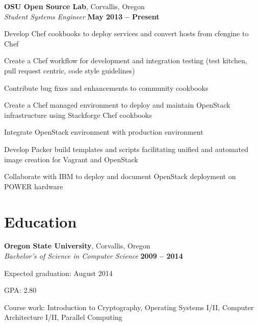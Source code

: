 \documentclass[margin,line]{resume}
\begin{document}
\begin{resume}
    \textbf{OSU Open Source Lab}, Corvallis, Oregon \vspace{2mm}\\\vspace{1mm}%
    \textsl{Student Systems Engineer} \hfill \textbf{May 2013 -- Present}\\
    \begin{list2}
        \item Develop Chef cookbooks to deploy services and convert hosts from cfengine to Chef
        \item Create a Chef workflow for development and integration testing (test kitchen, pull request centric, code style guidelines)
        \item Contribute bug fixes and enhancements to community cookbooks
        \item Create a Chef managed environment to deploy and maintain OpenStack infrastructure using Stackforge Chef cookbooks
        \item Integrate OpenStack environment with production environment
        \item Develop Packer build templates and scripts facilitating unified and automated image creation for Vagrant and OpenStack
        \item Collaborate with IBM to deploy and document OpenStack deployment on POWER hardware\\
    \end{list2}\vspace{-1.5mm}


    \section{\mysidestyle Education}

    \textbf{Oregon State University}, Corvallis, Oregon \vspace{2mm}\\\vspace{1mm}%
    \textsl{Bachelor's of Science in Computer Science} \hfill \textbf{ 2009 -- 2014}\vspace{-3mm}\\\vspace{-1mm}%
    \begin{list2}
        \item Expected graduation: August 2014
        \item GPA:  2.80
        \item Course work: Introduction to Cryptography, Operating Systems I/II,
              Computer Architecture I/II, Parallel Computing\\
    \end{list2}\vspace{-1.5mm}



\end{resume}
\end{document}
